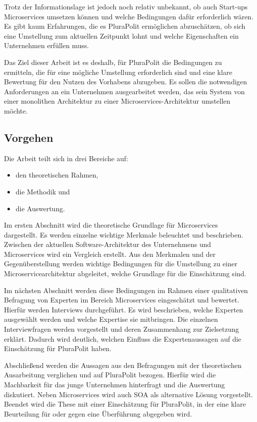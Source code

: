 Trotz der Informationslage ist jedoch noch relativ unbekannt, ob auch Start-ups Microservices umsetzen können und welche Bedingungen dafür erforderlich wären. Es gibt kaum Erfahrungen, die es PluraPolit ermöglichen abzuschätzen, ob sich eine Umstellung zum aktuellen Zeitpunkt lohnt und welche Eigenschaften ein Unternehmen erfüllen muss.

Das Ziel dieser Arbeit ist es deshalb, für PluraPolit die Bedingungen zu ermitteln, die für eine mögliche Umstellung erforderlich sind und eine klare Bewertung für den Nutzen des Vorhabens abzugeben. Es sollen die notwendigen Anforderungen an ein Unternehmen ausgearbeitet werden, das sein System von einer monolithen Architektur zu einer Microservices-Architektur umstellen möchte.


\subsection{Vorgehen}

Die Arbeit teilt sich in drei Bereiche auf: 
\begin{itemize}
	\item den theoretischen Rahmen,
	\item die Methodik und
	\item die Auswertung.
\end{itemize}

Im ersten Abschnitt wird die theoretische Grundlage für Microservices dargestellt. Es werden einzelne wichtige Merkmale beleuchtet und beschrieben. Zwischen der aktuellen Software-Architektur des Unternehmens und Microservices wird ein Vergleich erstellt. Aus den Merkmalen und der Gegenüberstellung werden wichtige Bedingungen für die Umstellung zu einer Microservicearchitektur abgeleitet, welche Grundlage für die Einschätzung sind.

Im nächsten Abschnitt werden diese Bedingungen im Rahmen einer qualitativen Befragung von Experten im Bereich Microservices eingeschätzt und bewertet. Hierfür werden Interviews durchgeführt. Es wird beschrieben, welche Experten ausgewählt werden und welche Expertise sie mitbringen. Die einzelnen Interviewfragen werden vorgestellt und deren Zusammenhang zur Zielsetzung erklärt. Dadurch wird deutlich, welchen Einfluss die Expertenaussagen auf die Einschätzung für PluraPolit haben.

Abschließend werden die Aussagen aus den Befragungen mit der theoretischen Ausarbeitung verglichen und auf PluraPolit bezogen. Hierfür wird die Machbarkeit für das junge Unternehmen hinterfragt und die Auswertung diskutiert. Neben Microservices wird auch SOA als alternative Lösung vorgestellt. Beendet wird die These mit einer Einschätzung für PluraPolit, in der eine klare Beurteilung für oder gegen eine Überführung abgegeben wird.
